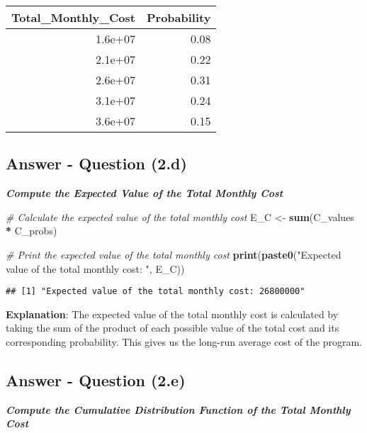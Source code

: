 \documentclass[
  11pt,
]{article}
\newenvironment{Shaded}{\begin{snugshade}}{\end{snugshade}}
\newcommand{\CommentTok}[1]{\textcolor[rgb]{0.56,0.35,0.01}{\textit{#1}}}
\newcommand{\FunctionTok}[1]{\textcolor[rgb]{0.13,0.29,0.53}{\textbf{#1}}}
\newcommand{\NormalTok}[1]{#1}
\newcommand{\OtherTok}[1]{\textcolor[rgb]{0.56,0.35,0.01}{#1}}
\newcommand{\SpecialCharTok}[1]{\textcolor[rgb]{0.81,0.36,0.00}{\textbf{#1}}}
\newcommand{\StringTok}[1]{\textcolor[rgb]{0.31,0.60,0.02}{#1}}
\begin{document}
\begin{tabular}{r|r}
\hline
Total\_Monthly\_Cost & Probability\\
\hline
1.6e+07 & 0.08\\
\hline
2.1e+07 & 0.22\\
\hline
2.6e+07 & 0.31\\
\hline
3.1e+07 & 0.24\\
\hline
3.6e+07 & 0.15\\
\hline
\end{tabular}

\subsection{Answer - Question (2.d)}\label{answer---question-2.d}

\textbf{\emph{Compute the Expected Value of the Total Monthly Cost}}

\begin{Shaded}
\begin{Highlighting}[]
\CommentTok{\# Calculate the expected value of the total monthly cost}
\NormalTok{E\_C }\OtherTok{\textless{}{-}} \FunctionTok{sum}\NormalTok{(C\_values }\SpecialCharTok{*}\NormalTok{ C\_probs)}

\CommentTok{\# Print the expected value of the total monthly cost}
\FunctionTok{print}\NormalTok{(}\FunctionTok{paste0}\NormalTok{(}\StringTok{"Expected value of the total monthly cost: "}\NormalTok{, E\_C))}
\end{Highlighting}
\end{Shaded}

\begin{verbatim}
## [1] "Expected value of the total monthly cost: 26800000"
\end{verbatim}

\textbf{Explanation}: The expected value of the total monthly cost is
calculated by taking the sum of the product of each possible value of
the total cost and its corresponding probability. This gives us the
long-run average cost of the program.

\subsection{Answer - Question (2.e)}\label{answer---question-2.e}

\textbf{\emph{Compute the Cumulative Distribution Function of the Total
Monthly Cost}}
\end{document}
